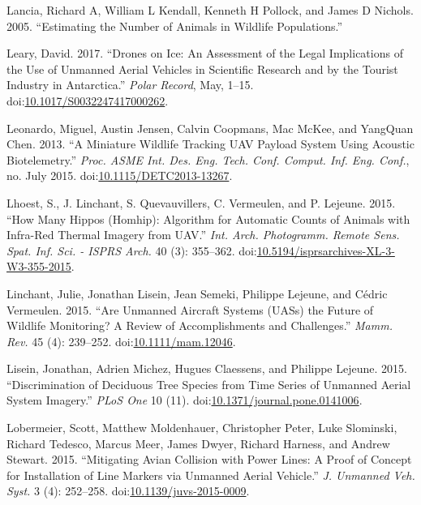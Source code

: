\documentclass[]{interact}
\theoremstyle{plain}%
\theoremstyle{definition}
\theoremstyle{remark}
\begin{document}
\hypertarget{ref-lancia_estimating_2005}{}
Lancia, Richard A, William L Kendall, Kenneth H Pollock, and James D
Nichols. 2005. ``Estimating the Number of Animals in Wildlife
Populations.''

\hypertarget{ref-leary_drones_2017}{}
Leary, David. 2017. ``Drones on Ice: An Assessment of the Legal
Implications of the Use of Unmanned Aerial Vehicles in Scientific
Research and by the Tourist Industry in Antarctica.'' \emph{Polar
Record}, May, 1--15.
doi:\href{https://doi.org/10.1017/S0032247417000262}{10.1017/S0032247417000262}.

\hypertarget{ref-leonardo_miniature_2013}{}
Leonardo, Miguel, Austin Jensen, Calvin Coopmans, Mac McKee, and
YangQuan Chen. 2013. ``A Miniature Wildlife Tracking UAV Payload System
Using Acoustic Biotelemetry.'' \emph{Proc. ASME Int. Des. Eng. Tech.
Conf. Comput. Inf. Eng. Conf.}, no. July 2015.
doi:\href{https://doi.org/10.1115/DETC2013-13267}{10.1115/DETC2013-13267}.

\hypertarget{ref-lhoest_how_2015}{}
Lhoest, S., J. Linchant, S. Quevauvillers, C. Vermeulen, and P. Lejeune.
2015. ``How Many Hippos (Homhip): Algorithm for Automatic Counts of
Animals with Infra-Red Thermal Imagery from UAV.'' \emph{Int. Arch.
Photogramm. Remote Sens. Spat. Inf. Sci. - ISPRS Arch.} 40 (3):
355--362.
doi:\href{https://doi.org/10.5194/isprsarchives-XL-3-W3-355-2015}{10.5194/isprsarchives-XL-3-W3-355-2015}.

\hypertarget{ref-linchant_are_2015}{}
Linchant, Julie, Jonathan Lisein, Jean Semeki, Philippe Lejeune, and
Cédric Vermeulen. 2015. ``Are Unmanned Aircraft Systems (UASs) the
Future of Wildlife Monitoring? A Review of Accomplishments and
Challenges.'' \emph{Mamm. Rev.} 45 (4): 239--252.
doi:\href{https://doi.org/10.1111/mam.12046}{10.1111/mam.12046}.

\hypertarget{ref-lisein_discrimination_2015}{}
Lisein, Jonathan, Adrien Michez, Hugues Claessens, and Philippe Lejeune.
2015. ``Discrimination of Deciduous Tree Species from Time Series of
Unmanned Aerial System Imagery.'' \emph{PLoS One} 10 (11).
doi:\href{https://doi.org/10.1371/journal.pone.0141006}{10.1371/journal.pone.0141006}.

\hypertarget{ref-lobermeier_mitigating_2015}{}
Lobermeier, Scott, Matthew Moldenhauer, Christopher Peter, Luke
Slominski, Richard Tedesco, Marcus Meer, James Dwyer, Richard Harness,
and Andrew Stewart. 2015. ``Mitigating Avian Collision with Power Lines:
A Proof of Concept for Installation of Line Markers via Unmanned Aerial
Vehicle.'' \emph{J. Unmanned Veh. Syst.} 3 (4): 252--258.
doi:\href{https://doi.org/10.1139/juvs-2015-0009}{10.1139/juvs-2015-0009}.
\end{document}
